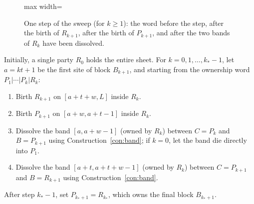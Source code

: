 \begin{figure}[t]
\centering
\begin{adjustbox}{max width=\linewidth}

\end{adjustbox}
\caption{One step of the sweep (for $k\ge1$): the word before the step, after the birth of $R_{k+1}$, after the birth of $P_{k+1}$, and after the two bands of $R_k$ have been dissolved.}\label{fig:sweep-step}
\end{figure}

\begin{construction}\label{con:sweep}
Initially, a single party $R_0$ holds the entire sheet. For $k=0,1,\dots,k_*-1$, let
$a=kt+1$ be the first site of block $B_{k+1}$, and starting from the ownership word $P_1|\cdots|P_k|R_k$:
\begin{enumerate}[leftmargin=2em]
\item[(1)] Birth $R_{k+1}$ on $[a+t+w,L]$ inside $R_k$.
\item[(2)] Birth $P_{k+1}$ on $[a+w,a+t-1]$ inside $R_k$.
\item[(3)] Dissolve the band $[a,a+w-1]$ (owned by $R_k$) between $C=P_k$
and $B=P_{k+1}$ using Construction~\ref{con:band}; if $k=0$, let the band die directly
into $P_1$.
\item[(4)] Dissolve the band $[a+t,a+t+w-1]$ (owned by $R_k$) between
$C=P_{k+1}$ and $B=R_{k+1}$ using Construction~\ref{con:band}.
\end{enumerate}
After step $k_*-1$, set $P_{k_*+1}=R_{k_*}$, which owns the final block $B_{k_*+1}$.
\end{construction}


